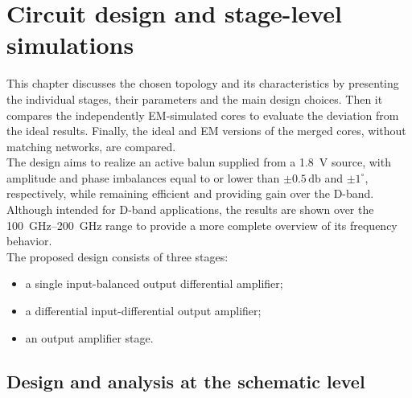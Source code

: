 \section{Circuit design and stage-level simulations}
\label{sec:Schematic_Design}
This chapter discusses the chosen topology and its characteristics by presenting the individual stages, their parameters and the main design choices. Then it compares the independently EM-simulated cores to evaluate the deviation from the ideal results. Finally, the ideal and EM versions of the merged cores, without matching networks, are compared.\\
The design aims to realize an active balun supplied from a \SI{1.8}{\volt} source, with amplitude and phase imbalances equal to or lower than $\pm 0.5\,\si{\decibel}$ and $\pm 1^{\circ}$, respectively, while remaining efficient and providing gain over the D-band. Although intended for D-band applications, the results are shown over the \SIrange{100}{200}{\giga\hertz} range to provide a more complete overview of its frequency behavior.\\
The proposed design consists of three stages:
\begin{itemize}
    \item a single input-balanced output differential amplifier;
    \item a differential input-differential output amplifier;
    \item an output amplifier stage.
\end{itemize}

\subsection{Design and analysis at the schematic level}
